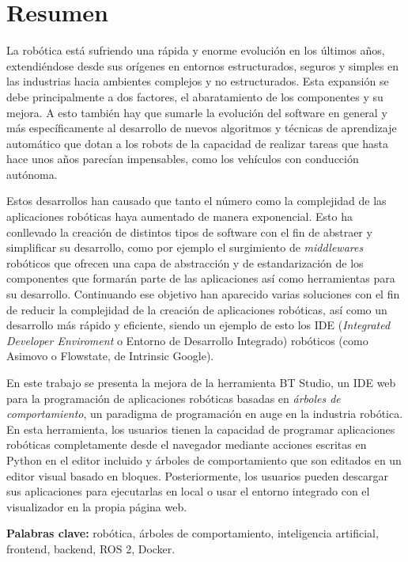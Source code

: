 \chapter*{Resumen}

La robótica está sufriendo una rápida y enorme evolución en los últimos años, extendiéndose desde sus orígenes en entornos estructurados, seguros y simples en las industrias hacia ambientes complejos y no estructurados. Esta expansión se debe principalmente a dos factores, el abaratamiento de los componentes y su mejora. A esto también hay que sumarle la evolución del software en general y más específicamente al desarrollo de nuevos algoritmos y técnicas de aprendizaje automático que dotan a los robots de la capacidad de realizar tareas que hasta hace unos años parecían impensables, como los vehículos con conducción autónoma.

Estos desarrollos han causado que tanto el número como la complejidad de las aplicaciones robóticas haya aumentado de manera exponencial. Esto ha conllevado la creación de distintos tipos de software con el fin de abstraer y simplificar su desarrollo, como por ejemplo el surgimiento de \textit{middlewares} robóticos que ofrecen una capa de abstracción y de estandarización de los componentes que formarán parte de las aplicaciones así como herramientas para su desarrollo. Continuando ese objetivo han aparecido varias soluciones con el fin de reducir la complejidad de la creación de aplicaciones robóticas, así como un desarrollo más rápido y eficiente, siendo un ejemplo de esto los IDE (\textit{Integrated Developer Enviroment} o Entorno de Desarrollo Integrado) robóticos (como Asimovo o Flowstate, de Intrinsic Google).

En este trabajo se presenta la mejora de la herramienta BT Studio, un IDE web para la programación de aplicaciones robóticas basadas en \textit{árboles de comportamiento}, un paradigma de programación en auge en la industria robótica. En esta herramienta, los usuarios tienen la capacidad de programar aplicaciones robóticas completamente desde el navegador mediante acciones escritas en Python en el editor incluido y árboles de comportamiento que son editados en un editor visual basado en bloques. Posteriormente, los usuarios pueden descargar sus aplicaciones para ejecutarlas en local o usar el entorno integrado con el visualizador en la propia página web.

\vspace{.5cm}

\textbf{Palabras clave:} robótica, árboles de comportamiento, inteligencia artificial, frontend, backend, ROS 2, Docker. 